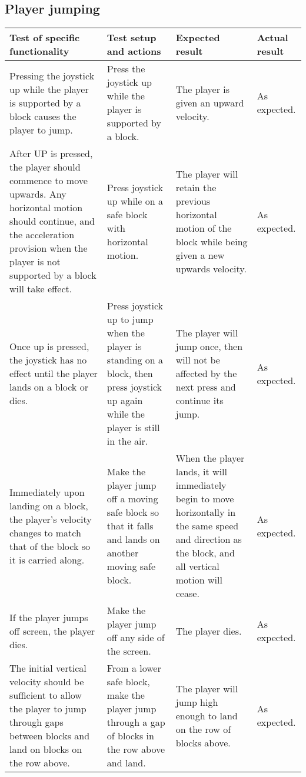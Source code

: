 \documentclass[10pt, titlepage]{article}
\newenvironment{testplan}[1]
{
\newcommand{\test}[4]{\midrule ##1 & ##2 & ##3 & ##4 \\}
\subsection{#1}
\begin{longtable}{L{0.3\textwidth}L{0.2\textwidth}L{0.25\textwidth}L{0.15\textwidth}}
\toprule
\textbf{Test of specific functionality} & \textbf{Test setup and actions} & \textbf{Expected result} & \textbf{Actual result} \\
}
{
\bottomrule
\end{longtable}
}
\begin{document}
\begin{testplan}{Player jumping}
\test{Pressing the joystick up while the player is supported by a block causes the player to jump.}{Press the joystick up while the player is supported by a block.}{The player is given an upward velocity.}{As expected.}
\test{After UP is pressed, the player should commence to move upwards. Any horizontal motion should continue, and the acceleration provision when the player is not supported by a block will take effect.}{Press joystick up while on a safe block with horizontal motion.}{The player will retain the previous horizontal motion of the block while being given a new upwards velocity.}{As expected.}
\test{Once up is pressed, the joystick has no effect until the player lands on a block or dies.}{Press joystick up to jump when the player is standing on a block, then press joystick up again while the player is still in the air.}{The player will jump once, then will not be affected by the next press and continue its jump.}{As expected.}
\test{Immediately upon landing on a block, the player's velocity changes to match that of the block so it is carried along.}{Make the player jump off a moving safe block so that it falls and lands on another moving safe block.}{When the player lands, it will immediately begin to move horizontally in the same speed and direction as the block, and all vertical motion will cease.}{As expected.}
\test{If the player jumps off screen, the player dies.}{Make the player jump off any side of the screen.}{The player dies.}{As expected.}
\test{The initial vertical velocity should be sufficient to allow the player to jump through gaps between blocks and land on blocks on the row above.}{From a lower safe block, make the player jump through a gap of blocks in the row above and land.}{The player will jump high enough to land on the row of blocks above.}{As expected.}
\end{testplan}
\end{document}
